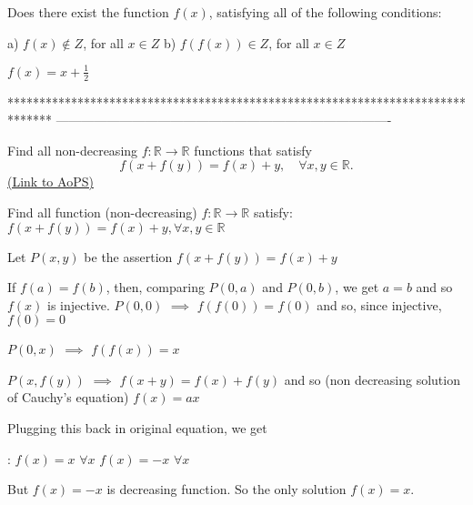 \begin{solution}
	\begin{tcolorbox}Does there exist the function $f(x)$, satisfying all of the following conditions:

a) $f(x){\notin}Z$, for all $x{\in}Z$
b) $f(f(x)){\in}Z$, for all $x{\in}Z$\end{tcolorbox}
$f(x)=x+\frac 12$
\end{solution}
*******************************************************************************
-------------------------------------------------------------------------------

\begin{problem}
	Find all non-decreasing $f:\mathbb{R}\rightarrow \mathbb{R}$ functions that satisfy
\[f(x+f(y))=f(x)+y, \quad \forall x, y\in \mathbb{R}.\]
	\flushright \href{https://artofproblemsolving.com/community/c6h446553}{(Link to AoPS)}
\end{problem}



\begin{solution}
	\begin{tcolorbox}Find all function (non-decreasing) $f:\mathbb{R}\rightarrow \mathbb{R}$ satisfy:
$f(x+f(y))=f(x)+y, \forall x, y\in \mathbb{R}$\end{tcolorbox}
Let $P(x,y)$ be the assertion $f(x+f(y))=f(x)+y$

If $f(a)=f(b)$, then, comparing $P(0,a)$ and $P(0,b)$, we get $a=b$ and so $f(x)$ is injective.
$P(0,0)$ $\implies$ $f(f(0))=f(0)$ and so, since injective, $f(0)=0$

$P(0,x)$ $\implies$ $f(f(x))=x$

$P(x,f(y))$ $\implies$ $f(x+y)=f(x)+f(y)$ and so (non decreasing solution of Cauchy's equation) $f(x)=ax$

Plugging this back in original equation, we get  :
$f(x)=x$ $\forall x$
$f(x)=-x$ $\forall x$
\end{solution}



\begin{solution}
	But $ f(x)=-x $ is  decreasing function. So the only solution $ f(x)=x $.
\end{solution}



